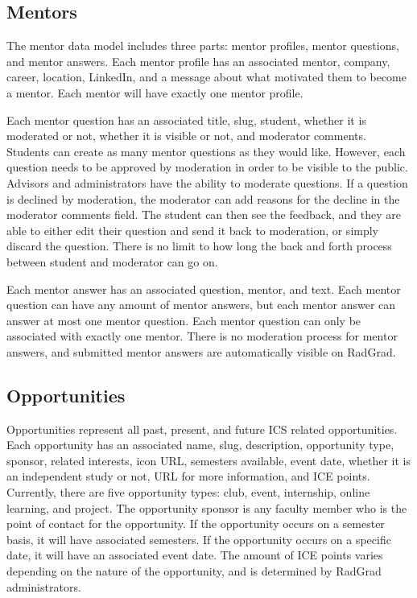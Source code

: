 \subsection{Mentors}
The mentor data model includes three parts: mentor profiles, mentor questions, and mentor answers. Each mentor profile has an associated mentor, company, career, location, LinkedIn, and a message about what motivated them to become a mentor. Each mentor will have exactly one mentor profile.  

Each mentor question has an associated title, slug, student, whether it is moderated or not, whether it is visible or not, and moderator comments. Students can create as many mentor questions as they would like. However, each question needs to be approved by moderation in order to be visible to the public. Advisors and administrators have the ability to moderate questions. If a question is declined by moderation, the moderator can add reasons for the decline in the moderator comments field. The student can then see the feedback, and they are able to either edit their question and send it back to moderation, or simply discard the question. There is no limit to how long the back and forth process between student and moderator can go on. 

Each mentor answer has an associated question, mentor, and text. Each mentor question can have any amount of mentor answers, but each mentor answer can answer at most one mentor question. Each mentor question can only be associated with exactly one mentor. There is no moderation process for mentor answers, and submitted mentor answers are automatically visible on RadGrad. 

\subsection{Opportunities}
Opportunities represent all past, present, and future ICS related opportunities.  Each opportunity has an associated name, slug, description, opportunity type, sponsor, related interests, icon URL, semesters available, event date, whether it is an independent study or not, URL for more information, and ICE points. Currently, there are five opportunity types: club, event, internship, online learning, and project. The opportunity sponsor is any faculty member who is the point of contact for the opportunity. If the opportunity occurs on a semester basis, it will have associated semesters. If the opportunity occurs on a specific date, it will have an associated event date. The amount of ICE points varies depending on the nature of the opportunity, and is determined by RadGrad administrators. 

